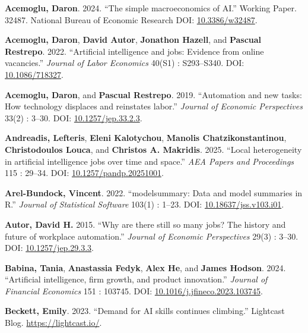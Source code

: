 \documentclass[
]{article}
\newlength{\cslhangindent}
\newenvironment{CSLReferences}[2] %
 {\begin{list}{}{%
  \setlength{\itemindent}{0pt}
  \setlength{\leftmargin}{0pt}
  \setlength{\parsep}{0pt}
  \ifodd #1
   \setlength{\leftmargin}{\cslhangindent}
   \setlength{\itemindent}{-1\cslhangindent}
  \fi
  \setlength{\itemsep}{#2\baselineskip}}}
 {\end{list}}
\begin{document}
\label{refs}
\begin{CSLReferences}{1}{0}
\textbf{Acemoglu, Daron}. 2024. {``The simple macroeconomics of {AI}.''}
Working Paper. 32487. National Bureau of Economic Research DOI:
\href{https://doi.org/10.3386/w32487}{10.3386/w32487}.

\textbf{Acemoglu, Daron}, \textbf{David Autor}, \textbf{Jonathon
Hazell}, and \textbf{Pascual Restrepo}. 2022. {``Artificial intelligence
and jobs: Evidence from online vacancies.''} \emph{Journal of Labor
Economics} 40(S1) : S293--S340. DOI:
\href{https://doi.org/10.1086/718327}{10.1086/718327}.

\textbf{Acemoglu, Daron}, and \textbf{Pascual Restrepo}. 2019.
{``Automation and new tasks: How technology displaces and reinstates
labor.''} \emph{Journal of Economic Perspectives} 33(2) : 3--30. DOI:
\href{https://doi.org/10.1257/jep.33.2.3}{10.1257/jep.33.2.3}.

\textbf{Andreadis, Lefteris}, \textbf{Eleni Kalotychou}, \textbf{Manolis
Chatzikonstantinou}, \textbf{Christodoulos Louca}, and \textbf{Christos
A. Makridis}. 2025. {``Local heterogeneity in artificial intelligence
jobs over time and space.''} \emph{AEA Papers and Proceedings} 115 :
29--34. DOI:
\href{https://doi.org/10.1257/pandp.20251001}{10.1257/pandp.20251001}.

\textbf{Arel-Bundock, Vincent}. 2022. {``{modelsummary}: Data and model
summaries in {R}.''} \emph{Journal of Statistical Software} 103(1) :
1--23. DOI:
\href{https://doi.org/10.18637/jss.v103.i01}{10.18637/jss.v103.i01}.

\textbf{Autor, David H.} 2015. {``Why are there still so many jobs? The
history and future of workplace automation.''} \emph{Journal of Economic
Perspectives} 29(3) : 3--30. DOI:
\href{https://doi.org/10.1257/jep.29.3.3}{10.1257/jep.29.3.3}.

\textbf{Babina, Tania}, \textbf{Anastassia Fedyk}, \textbf{Alex He}, and
\textbf{James Hodson}. 2024. {``Artificial intelligence, firm growth,
and product innovation.''} \emph{Journal of Financial Economics} 151 :
103745. DOI:
\href{https://doi.org/10.1016/j.jfineco.2023.103745}{10.1016/j.jfineco.2023.103745}.

\textbf{Beckett, Emily}. 2023. {``Demand for {AI} skills continues
climbing.''} Lightcast Blog. \url{https://lightcast.io/}.


\end{CSLReferences}
\end{document}

